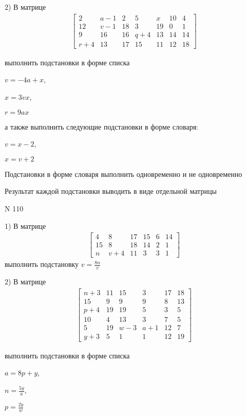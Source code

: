 \documentclass[11pt]{report}
\begin{document}
    2) В матрице
\begin{align*}
\left[\begin{matrix}2 & a - 1 & 2 & 5 & x & 10 & 4\\12 & v - 1 & 18 & 3 & 19 & 0 & 1\\9 & 16 & 16 & q + 4 & 13 & 14 & 14\\r + 4 & 13 & 17 & 15 & 11 & 12 & 18\end{matrix}\right]
\end{align*}

выполнить подстановки в форме списка

$v=- 4 a + x$,

$x=3 v x$,

$r=9 a x$

а также выполнить следующие подстановки в форме словаря:

$v=x - 2$,

$x=v + 2$


    Подстановки в форме словаря выполнить одновременно и не одновременно


    Результат каждой подстановки выводить в виде отдельной матрицы

\newpage
N 110


    1) В матрице
\begin{align*}
\left[\begin{matrix}4 & 8 & 17 & 15 & 6 & 14\\15 & 8 & 18 & 14 & 2 & 1\\n & v + 4 & 11 & 3 & 3 & 1\end{matrix}\right]
\end{align*}
выполнить подстановку $v=\frac{8 n}{v}$


    2) В матрице
\begin{align*}
\left[\begin{matrix}n + 3 & 11 & 15 & 3 & 17 & 18\\15 & 9 & 9 & 9 & 8 & 13\\p + 4 & 19 & 19 & 5 & 3 & 5\\10 & 4 & 13 & 3 & 7 & 5\\5 & 19 & w - 3 & a + 1 & 12 & 7\\y + 3 & 5 & 1 & 1 & 12 & 19\end{matrix}\right]
\end{align*}

выполнить подстановки в форме списка

$a=8 p + y$,

$n=\frac{5 y}{a}$,

$p=\frac{2 y}{w}$
\end{document}
